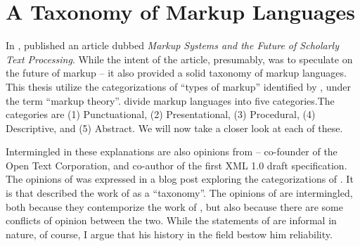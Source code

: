 \documentclass{scrreprt}
\begin{document}
% 






\section{A Taxonomy of Markup Languages}
\label{sec:taxonomy}
In \citeyear{coombs}, \citeauthor*{coombs} published an article dubbed \textit{Markup Systems and the Future of Scholarly Text Processing}. While the intent of the article, presumably, was to speculate on the future of markup -- it also provided a solid taxonomy of markup languages. This thesis utilize the categorizations of ``types of markup'' identified by \citet{coombs}, under the term ``markup theory''. \citet{coombs} divide markup languages into five categories.The categories are (1) Punctuational, (2) Presentational, (3) Procedural, (4) Descriptive, and (5) Abstract. We will now take a closer look at each of these.

Intermingled in these explanations are also opinions from \citet{bray} -- co-founder of the Open Text Corporation, and co-author of the first XML 1.0 draft specification. The opinions of \citeauthor{bray} was expressed in a blog post exploring the categorizations of \citet{coombs}. It is \citeauthor{bray} that described the work of \citeauthor{coombs} as a ``taxonomy''. The opinions of \citeauthor{bray} are intermingled, both because they contemporize the work of \citeauthor{coombs}, but also because there are some conflicts of opinion between the two. While the statements of \citeauthor{bray} are informal in nature, of course, I argue that his history in the field bestow him reliability.
\end{document}
